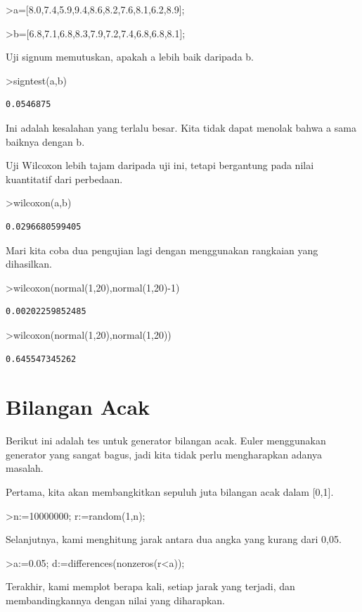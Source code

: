 \documentclass[
]{book}
\begin{document}
\textgreater a={[}8.0,7.4,5.9,9.4,8.6,8.2,7.6,8.1,6.2,8.9{]};

\textgreater b={[}6.8,7.1,6.8,8.3,7.9,7.2,7.4,6.8,6.8,8.1{]};

Uji signum memutuskan, apakah a lebih baik daripada b.

\textgreater signtest(a,b)

\begin{verbatim}
0.0546875
\end{verbatim}

Ini adalah kesalahan yang terlalu besar. Kita tidak dapat menolak bahwa a sama baiknya dengan b.

Uji Wilcoxon lebih tajam daripada uji ini, tetapi bergantung pada nilai kuantitatif dari perbedaan.

\textgreater wilcoxon(a,b)

\begin{verbatim}
0.0296680599405
\end{verbatim}

Mari kita coba dua pengujian lagi dengan menggunakan rangkaian yang dihasilkan.

\textgreater wilcoxon(normal(1,20),normal(1,20)-1)

\begin{verbatim}
0.00202259852485
\end{verbatim}

\textgreater wilcoxon(normal(1,20),normal(1,20))

\begin{verbatim}
0.645547345262
\end{verbatim}

\section{Bilangan Acak}\label{bilangan-acak}

Berikut ini adalah tes untuk generator bilangan acak. Euler menggunakan generator yang sangat bagus, jadi kita tidak perlu mengharapkan adanya masalah.

Pertama, kita akan membangkitkan sepuluh juta bilangan acak dalam {[}0,1{]}.

\textgreater n:=10000000; r:=random(1,n);

Selanjutnya, kami menghitung jarak antara dua angka yang kurang dari 0,05.

\textgreater a:=0.05; d:=differences(nonzeros(r\textless a));

Terakhir, kami memplot berapa kali, setiap jarak yang terjadi, dan membandingkannya dengan nilai yang diharapkan.
\end{document}

